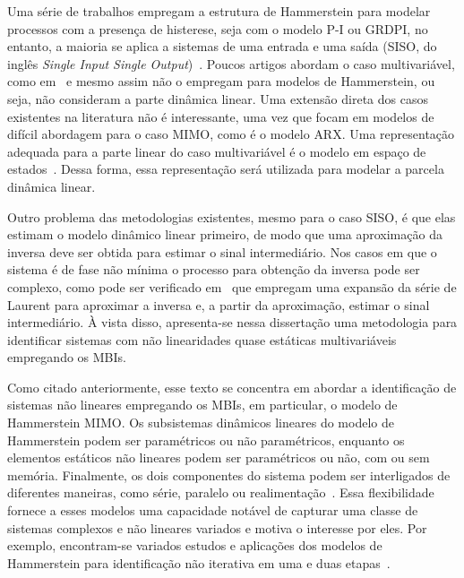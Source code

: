 \par 
Uma série de trabalhos empregam a estrutura de Hammerstein para modelar processos com a presença de histerese, seja com o modelo \acs{P-I} ou \acs{GRDPI}, no entanto, a maioria se aplica a sistemas de uma entrada e uma saída (\acs{SISO}, do inglês \textit{Single Input Single Output})~\citep{aljanaideh2018,aljanaideh2019,aljanaideh2022,aljanaideh2023}. Poucos artigos abordam o caso multivariável, como em~\citep{rakotondrabe2017} e mesmo assim não o empregam para modelos de Hammerstein, ou seja, não consideram a parte dinâmica linear. Uma extensão direta dos casos existentes na literatura não é interessante, uma vez que focam em modelos de difícil abordagem para o caso \acs{MIMO}, como é o modelo \acs{ARX}. Uma representação adequada para a parte linear do caso multivariável é o modelo em espaço de estados~\citep{verhaegen1992a,verhaegen1992b}. Dessa forma, essa representação será utilizada para modelar a parcela dinâmica linear. 
\par 
Outro problema das metodologias existentes, mesmo para o caso \acs{SISO}, é que elas estimam o modelo dinâmico linear primeiro, de modo que uma aproximação da inversa deve ser obtida para estimar o sinal intermediário. Nos casos em que o sistema é de fase não mínima o processo para obtenção da inversa pode ser complexo, como pode ser verificado em~\citep{aljanaideh2018,aljanaideh2022} que empregam uma expansão da série de Laurent para aproximar a inversa e, a partir da aproximação, estimar o sinal intermediário. À vista disso, apresenta-se nessa dissertação uma metodologia para identificar sistemas com não linearidades quase estáticas multivariáveis empregando os \acsp{MBI}. 
\par 
Como citado anteriormente, esse texto se concentra em abordar a identificação de sistemas não lineares empregando os \acsp{MBI}, em particular, o  modelo de Hammerstein \acs{MIMO}. Os subsistemas dinâmicos lineares do modelo de Hammerstein podem ser paramétricos ou não paramétricos, enquanto os elementos estáticos não lineares podem ser paramétricos ou não, com ou sem memória. Finalmente, os dois componentes do sistema podem ser interligados de diferentes maneiras, como série, paralelo ou realimentação~\citep{bai2010}. Essa flexibilidade fornece a esses modelos uma capacidade notável de capturar uma classe de sistemas complexos e não lineares variados e motiva o interesse por eles. Por exemplo, encontram-se variados estudos e aplicações dos modelos de Hammerstein para identificação não iterativa em uma e duas etapas~\citep{gomez2005,kian2013,depaula2015,li2017,santos2021,hou2022}.
